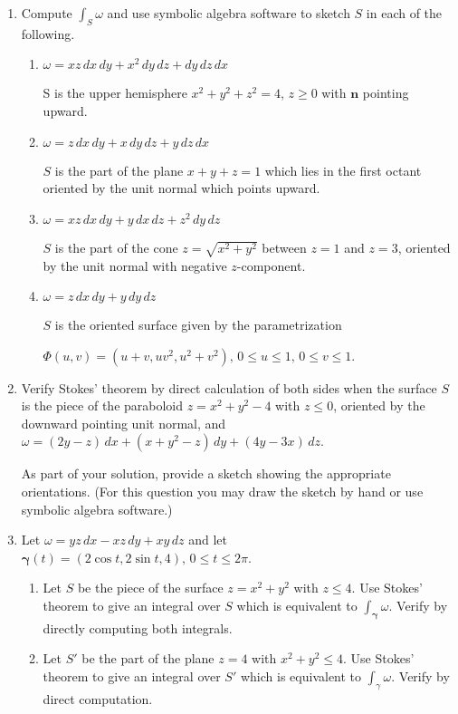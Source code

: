 \documentclass{article}
\begin{document}
\begin{enumerate}
    \newpage
    \item Compute $\displaystyle \int_S \omega$ and use symbolic algebra software to sketch $S$ in each of the following.
    \begin{enumerate}
        \item $\omega = xz \, dx \, dy + x^2 \, dy \, dz + dy \, dz \, dx$
        
        S is the upper hemisphere $x^2 + y^2 + z^2 = 4$, $z \geq 0$ with $\boldsymbol n$ pointing upward.


        \item $\omega = z \, dx \, dy + x \, dy \, dz + y \, dz \, dx$

        $S$ is the part of the plane $x+y+z = 1$ which lies in the first octant oriented by the unit normal which points upward.

        \item $\omega  = xz \, dx \, dy + y \, dx \, dz + z^2 \, dy \, dz$

        $S$ is the part of the cone $z = \sqrt{x^2 + y^2}$ between $z=1$ and $z=3$,  oriented by the unit normal with negative $z$-component.

        \item $\omega = z \, dx \, dy + y \, dy \, dz$
        
        $S$ is the oriented surface given by the parametrization

        $\Phi (u,v) = (u+v, uv^2, u^2 + v^2),\, 0 \leq u \leq 1,\, 0\leq v \leq 1$.
    \end{enumerate}

    \newpage
    \item Verify Stokes' theorem by direct calculation of both sides when the surface $S$ is the piece of the paraboloid $z= x^2 + y^2 - 4$ with $z \leq 0$, oriented by the downward pointing unit normal, and $\omega = (2y-z)\, dx + (x + y^2 - z)\, dy + (4y-3x)\, dz$.

    As part of your solution, provide a sketch showing the appropriate orientations. (For this question you may draw the sketch by hand or use symbolic algebra software.)
    \newpage
    \item Let $\omega = yz\, dx - xz \, dy + xy \, dz$ and let $\boldsymbol \gamma(t) = (2\cos t, 2\sin t, 4),\, 0 \leq t \leq 2\pi$.
    \begin{enumerate}
        \item Let $S$ be the piece of the surface $z = x^2 + y^2$ with $z \leq 4$. Use Stokes' theorem to give an integral over $S$ which is equivalent to $\displaystyle \int_{\boldsymbol \gamma} \omega$. Verify by directly computing both integrals.
        \item Let $S'$ be the part of the plane $z=4$ with $x^2 + y^2 \leq 4$. Use Stokes' theorem to give an integral over $S'$ which is equivalent to $\displaystyle \int_{\gamma} \omega$. Verify by direct computation.
        

\end{enumerate}
\end{enumerate}
\end{document}
